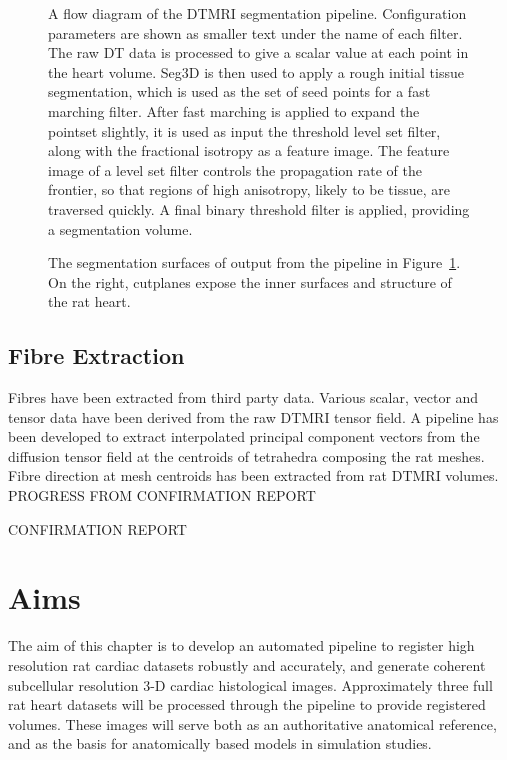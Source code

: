     
\begin{figure}[htbp]
  \centering
  \caption{A flow diagram of the DTMRI segmentation pipeline. Configuration parameters are shown as smaller text under the name of each filter. The raw DT data is processed to give a scalar value at each point in the heart volume. Seg3D is then used to apply a rough initial tissue segmentation, which is used as the set of seed points for a fast marching filter. After fast marching is applied to expand the pointset slightly, it is used as input the threshold level set filter, along with the fractional isotropy as a feature image. The feature image of a level set filter controls the propagation rate of the frontier, so that regions of high anisotropy, likely to be tissue, are traversed quickly. A final binary threshold filter is applied, providing a segmentation volume.}
  \label{fig:pipeline}
\end{figure}

\begin{figure}[htbp]
  \centering
  \caption{The segmentation surfaces of output from the pipeline in Figure~\ref{fig:pipeline}. On the right, cutplanes expose the inner surfaces and structure of the rat heart.}
  \label{fig:segmentation}
\end{figure}

  \subsection{Fibre Extraction}
    Fibres have been extracted from third party data. Various scalar, vector and tensor data have been derived from the raw DTMRI tensor field. A pipeline has been developed to extract interpolated principal component vectors from the diffusion tensor field at the centroids of tetrahedra composing the rat meshes. Fibre direction at mesh centroids has been extracted from rat DTMRI volumes.
PROGRESS FROM CONFIRMATION REPORT



CONFIRMATION REPORT
\section{Aims}
  The aim of this chapter is to develop an automated pipeline to register high resolution rat cardiac datasets robustly and accurately, and generate coherent subcellular resolution 3-D cardiac histological images.  Approximately three full rat heart datasets will be processed through the pipeline to provide registered volumes. These images will serve both as an authoritative anatomical reference, and as the basis for anatomically based models in simulation studies.

